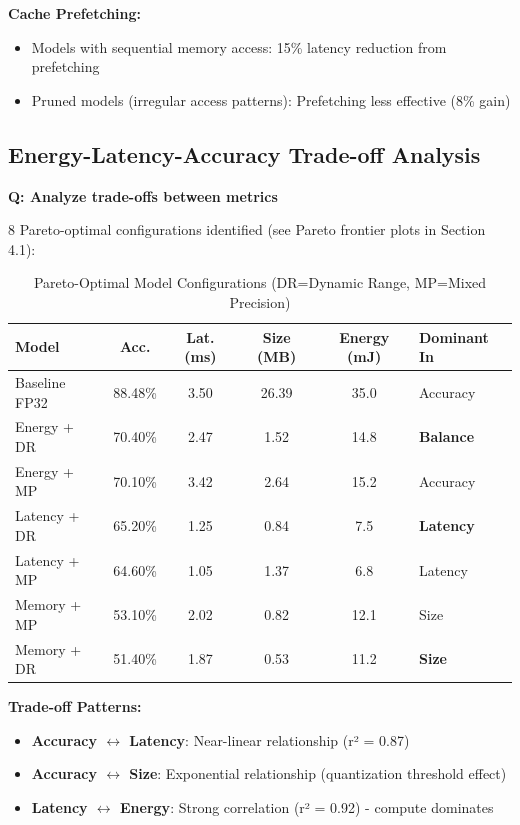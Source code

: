 \documentclass[10pt, a4paper]{article}
\begin{document}
\textbf{Cache Prefetching:}
\begin{itemize}
    \item Models with sequential memory access: 15\% latency reduction from prefetching
    \item Pruned models (irregular access patterns): Prefetching less effective (8\% gain)
\end{itemize}

\subsection{Energy-Latency-Accuracy Trade-off Analysis}

\textbf{Q: Analyze trade-offs between metrics}

8 Pareto-optimal configurations identified (see Pareto frontier plots in Section 4.1):

\begin{table}[H]
\centering
\scriptsize
\begin{tabular}{|l|c|c|c|c|l|}
\hline
\textbf{Model} & \textbf{Acc.} & \textbf{Lat. (ms)} & \textbf{Size (MB)} & \textbf{Energy (mJ)} & \textbf{Dominant In} \\
\hline
Baseline FP32 & 88.48\% & 3.50 & 26.39 & 35.0 & Accuracy \\
Energy + DR & 70.40\% & 2.47 & 1.52 & 14.8 & \textbf{Balance} \\
Energy + MP & 70.10\% & 3.42 & 2.64 & 15.2 & Accuracy \\
Latency + DR & 65.20\% & 1.25 & 0.84 & 7.5 & \textbf{Latency} \\
Latency + MP & 64.60\% & 1.05 & 1.37 & 6.8 & Latency \\
Memory + MP & 53.10\% & 2.02 & 0.82 & 12.1 & Size \\
Memory + DR & 51.40\% & 1.87 & 0.53 & 11.2 & \textbf{Size} \\
\hline
\end{tabular}
\caption{Pareto-Optimal Model Configurations (DR=Dynamic Range, MP=Mixed Precision)}
\end{table}

\textbf{Trade-off Patterns:}
\begin{itemize}
    \item \textbf{Accuracy $\leftrightarrow$ Latency}: Near-linear relationship (r² = 0.87)
    \item \textbf{Accuracy $\leftrightarrow$ Size}: Exponential relationship (quantization threshold effect)
    \item \textbf{Latency $\leftrightarrow$ Energy}: Strong correlation (r² = 0.92) - compute dominates
\end{itemize}
\end{document}
